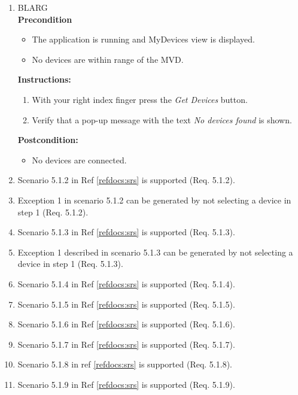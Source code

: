 \documentclass[a4paper]{article}
\newlength{\testlabellength}
\newenvironment{testlist}{\begin{enumerate}[label=\bfseries Instruction \thesubsection.\arabic* , labelindent=0pt, labelwidth=\testlabellength , leftmargin=2cm]}{\end{enumerate}}
\newenvironment{precondition}{
{\color{white}BLARG}\\ 
\textbf{Precondition}
\begin{itemize}[labelindent=0cm, labelwidth=2cm , leftmargin=1cm]
}
{\end{itemize}}
\newenvironment{instruction}{
\textbf{Instructions:}
\begin{enumerate}[label=\bfseries  \arabic*., labelindent=0cm, labelwidth=2cm , leftmargin=1cm]
}
{\end{enumerate}}
\newenvironment{postcondition}{
\textbf{Postcondition:}
\begin{itemize}[labelindent=0cm, labelwidth=2cm , leftmargin=1cm]
}
{\end{itemize}}
\begin{document}
\begin{appendices}
\begin{testlist}
	\item 
	\begin{precondition}
		\item The application is running and MyDevices view is displayed.
		\item No devices are within range of the MVD.
	\end{precondition}
	\begin{instruction}
			\item With your right index finger press the \emph{Get Devices} button.
			\item Verify that a pop-up message with the text \emph{No devices found} is shown.
	\end{instruction}
	\begin{postcondition}
		\item No devices are connected.
	\end{postcondition}
	
	\item Scenario 5.1.2 in Ref \ref{refdocs:srs} is supported (Req. 5.1.2).
	
	\item Exception 1 in scenario 5.1.2 can be generated by not selecting a device in step 1 (Req. 5.1.2).
	
	\item Scenario 5.1.3 in Ref \ref{refdocs:srs} is supported (Req. 5.1.3).
	
	\item Exception 1 described in scenario 5.1.3 can be generated by not selecting a device in step 1 (Req. 5.1.3). 
	
	\item Scenario 5.1.4 in Ref \ref{refdocs:srs} is supported (Req. 5.1.4).
	
	\item Scenario 5.1.5 in Ref \ref{refdocs:srs} is supported (Req. 5.1.5).
	
	\item Scenario 5.1.6 in Ref \ref{refdocs:srs} is supported (Req. 5.1.6).
	
	\item Scenario 5.1.7 in Ref \ref{refdocs:srs} is supported (Req. 5.1.7).
	
	\item Scenario 5.1.8 in ref \ref{refdocs:srs} is supported (Req. 5.1.8).

	\item Scenario 5.1.9 in Ref \ref{refdocs:srs} is supported (Req. 5.1.9).
	

\end{testlist}
\end{appendices}
\end{document}
